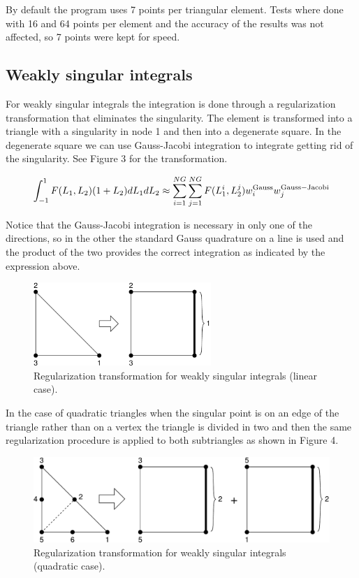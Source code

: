 \documentclass[12pt]{article}
\begin{document}
By default the program uses 7 points per triangular element. Tests where done with 16 and 64 points per element and the accuracy of the results was not affected, so 7 points were kept for speed.

\subsection*{Weakly singular integrals}
For weakly singular integrals the integration is done through a regularization transformation that eliminates the singularity. The element is transformed into a triangle with a singularity in node 1 and then into a degenerate square. In the degenerate square we can use Gauss-Jacobi integration to integrate getting rid of the singularity. See Figure 3 for the transformation.

\begin{equation}
\int_{-1}^1{F(L_1,L_2)(1+L_2)dL_1dL_2} \approx \sum_{i=1}^{NG}{\sum_{j=1}^{NG}{F(L_1^i,L_2^j)w_i^{\rm Gauss}w_j^{\rm Gauss-Jacobi}}}
\end{equation}

Notice that the Gauss-Jacobi integration is necessary in only one of the directions, so in the other the standard Gauss quadrature on a line is used and the product of the two provides the correct integration as indicated by the expression above.

\begin{figure}[!hbt]
\begin{center}
\includegraphics[width=0.6\textwidth, viewport = 0 0 402 188]{weakly_singular.pdf}
\caption{Regularization transformation for weakly singular integrals (linear case).}
\end{center}
\end{figure}

In the case of quadratic triangles when the singular point is on an edge of the triangle rather than on a vertex the triangle is divided in two and then the same regularization procedure is applied to both subtriangles as shown in Figure 4.

\begin{figure}[!hbt]
\begin{center}
\includegraphics[width=\textwidth]{weakly_singular_t6.pdf}
\caption{Regularization transformation for weakly singular integrals (quadratic case).}
\end{center}
\end{figure}
\end{document}
